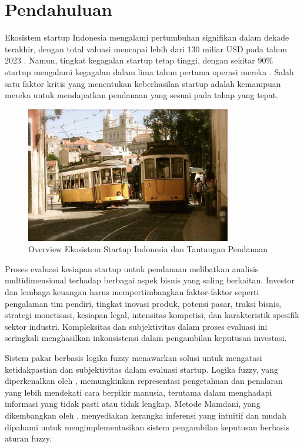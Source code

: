 \documentclass[12pt,a4paper]{article}
\begin{document}
\section{Pendahuluan}

Ekosistem startup Indonesia mengalami pertumbuhan signifikan dalam dekade terakhir, dengan total valuasi mencapai lebih dari 130 miliar USD pada tahun 2023 \citep{Sartika2023}. Namun, tingkat kegagalan startup tetap tinggi, dengan sekitar 90\% startup mengalami kegagalan dalam lima tahun pertama operasi mereka \citep{Rahman2022}. Salah satu faktor kritis yang menentukan keberhasilan startup adalah kemampuan mereka untuk mendapatkan pendanaan yang sesuai pada tahap yang tepat.

\begin{figure}[H]
    \centering
    \includegraphics[width=0.8\textwidth]{assets/image.png}
    \caption{Overview Ekosistem Startup Indonesia dan Tantangan Pendanaan}
    \label{fig:ecosystem}
\end{figure}

Proses evaluasi kesiapan startup untuk pendanaan melibatkan analisis multidimensional terhadap berbagai aspek bisnis yang saling berkaitan. Investor dan lembaga keuangan harus mempertimbangkan faktor-faktor seperti pengalaman tim pendiri, tingkat inovasi produk, potensi pasar, traksi bisnis, strategi monetisasi, kesiapan legal, intensitas kompetisi, dan karakteristik spesifik sektor industri. Kompleksitas dan subjektivitas dalam proses evaluasi ini seringkali menghasilkan inkonsistensi dalam pengambilan keputusan investasi.

Sistem pakar berbasis logika fuzzy menawarkan solusi untuk mengatasi ketidakpastian dan subjektivitas dalam evaluasi startup. Logika fuzzy, yang diperkenalkan oleh \citet{Zadeh1965}, memungkinkan representasi pengetahuan dan penalaran yang lebih mendekati cara berpikir manusia, terutama dalam menghadapi informasi yang tidak pasti atau tidak lengkap. Metode Mamdani, yang dikembangkan oleh \citet{Mamdani1975}, menyediakan kerangka inferensi yang intuitif dan mudah dipahami untuk mengimplementasikan sistem pengambilan keputusan berbasis aturan fuzzy.
\end{document}
